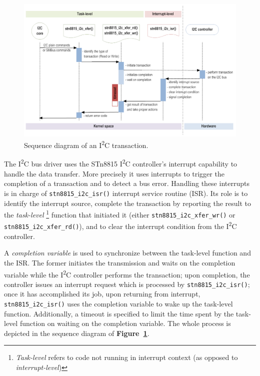 \documentclass[a4paper,10pt]{article}
\newcommand{\iic}{I\textsuperscript{2}C }
\newcommand{\keyword}[1]{\texttt{#1}}
\newcommand{\reff}[1]{\textbf{Figure~\ref{#1}}}
\begin{document}
\begin{multicols}{2}
\begin{figure}[t]
 \centering
 \includegraphics[width=16cm]
 	{./figures/i2c-data-transfer-seq-diag.png}
 \caption{Sequence diagram of an \iic transaction.}
 \label{fig:i2c-trans-seq-diag}
\end{figure}

The \iic bus driver uses the STn8815 \iic controller's interrupt
capability to handle the data transfer. More precisely it uses interrupts to
trigger the completion of a transaction and to detect a bus error. Handling
these interrupts is in charge of \keyword{stn8815\_i2c\_isr()} interrupt service
routine (ISR).
Its role is to identify the interrupt source, complete the transaction
by reporting the result to the \emph{task-level}
\footnote{\emph{Task-level} refers to code not running in interrupt context
(as opposed to \emph{interrupt-level})}
function that initiated it (either \keyword{stn8815\_i2c\_xfer\_wr()} or
\keyword{stn8815\_i2c\_xfer\_rd()}), and to clear the interrupt condition from
the \iic controller.

A \emph{completion variable} is used to synchronize between the task-level
function and the ISR. The former initiates the transmission and waits on the
completion variable while the \iic controller performs the transaction; upon
completion, the controller issues an interrupt request which is processed by
\keyword{stn8815\_i2c\_isr()}; once it has accomplished its job, upon returning
from interrupt, \keyword{stn8815\_i2c\_isr()} uses the completion variable to
wake up the task-level function.
Additionally, a timeout is specified to limit the time spent by the task-level
function on waiting on the completion variable. The whole process is depicted
in the sequence diagram of \reff{fig:i2c-trans-seq-diag}.


\end{multicols}
\end{document}
